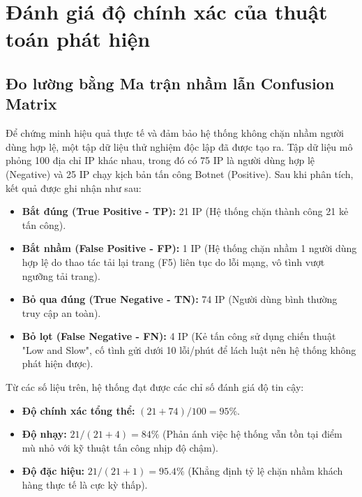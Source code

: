 \documentclass[12pt,a4paper]{report}
\begin{document}
\section{Đánh giá độ chính xác của thuật toán phát hiện}

\subsection{Đo lường bằng Ma trận nhầm lẫn Confusion Matrix}
Để chứng minh hiệu quả thực tế và đảm bảo hệ thống không chặn nhầm người dùng hợp lệ, một tập dữ liệu thử nghiệm độc lập đã được tạo ra. Tập dữ liệu mô phỏng 100 địa chỉ IP khác nhau, trong đó có 75 IP là người dùng hợp lệ (Negative) và 25 IP chạy kịch bản tấn công Botnet (Positive). Sau khi phân tích, kết quả được ghi nhận như sau:

\begin{itemize}
    \item \textbf{Bắt đúng (True Positive - TP):} 21 IP (Hệ thống chặn thành công 21 kẻ tấn công).
    \item \textbf{Bắt nhầm (False Positive - FP):} 1 IP (Hệ thống chặn nhầm 1 người dùng hợp lệ do thao tác tải lại trang (F5) liên tục do lỗi mạng, vô tình vượt ngưỡng tải trang).
    \item \textbf{Bỏ qua đúng (True Negative - TN):} 74 IP (Người dùng bình thường truy cập an toàn).
    \item \textbf{Bỏ lọt (False Negative - FN):} 4 IP (Kẻ tấn công sử dụng chiến thuật "Low and Slow", cố tình gửi dưới 10 lỗi/phút để lách luật nên hệ thống không phát hiện được).
\end{itemize}

Từ các số liệu trên, hệ thống đạt được các chỉ số đánh giá độ tin cậy:
\begin{itemize}
    \item \textbf{Độ chính xác tổng thể:} $(21 + 74) / 100 = 95\%$.
    \item \textbf{Độ nhạy:} $21 / (21 + 4) = 84\%$ (Phản ánh việc hệ thống vẫn tồn tại điểm mù nhỏ với kỹ thuật tấn công nhịp độ chậm).
    \item \textbf{Độ đặc hiệu:} $21 / (21 + 1) = 95.4\%$ (Khẳng định tỷ lệ chặn nhầm khách hàng thực tế là cực kỳ thấp).
\end{itemize}
\end{document}
